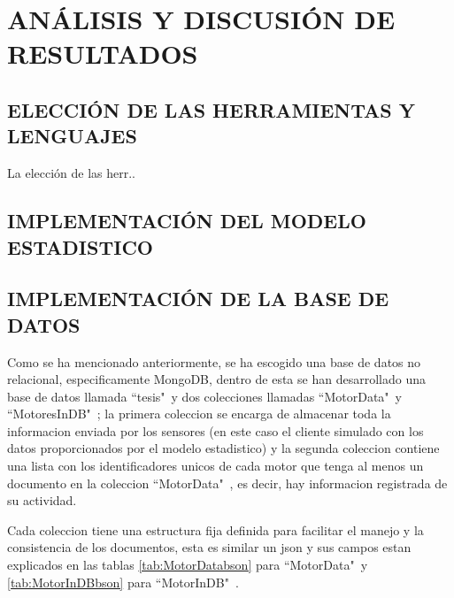 \thispagestyle{empty}

\section{ANÁLISIS Y DISCUSIÓN DE RESULTADOS}

\subsection{ELECCIÓN DE LAS HERRAMIENTAS Y LENGUAJES}
    La elección de las herr..


\subsection{IMPLEMENTACIÓN DEL MODELO ESTADISTICO}


\subsection{IMPLEMENTACIÓN DE LA BASE DE DATOS}

    Como se ha mencionado anteriormente, se ha escogido una base de datos no
    relacional, especificamente MongoDB, dentro de esta se han desarrollado
    una base de datos llamada ``tesis"\   y dos colecciones llamadas ``MotorData"\  y
    ``MotoresInDB"\ ; la primera coleccion se encarga de almacenar toda la informacion
    enviada por los sensores (en este caso el cliente simulado con los datos
    proporcionados por el modelo estadistico) y la segunda coleccion contiene una
    lista con los identificadores unicos de cada motor que tenga al menos un documento
    en la coleccion ``MotorData"\ , es decir, hay informacion registrada de su actividad.

    Cada coleccion tiene una estructura fija definida para facilitar el manejo y
    la consistencia de los documentos, esta es similar un json y sus campos
    estan explicados en las tablas \ref{tab:MotorDatabson} para ``MotorData"\  y
    \ref{tab:MotorInDBbson} para ``MotorInDB"\ .

